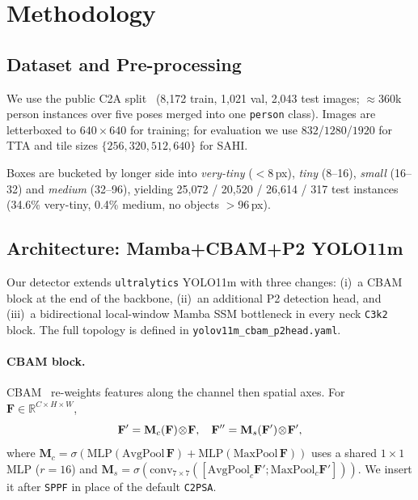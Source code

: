 \documentclass[11pt,a4paper]{article}
\begin{document}
\section{Methodology}
\subsection{Dataset and Pre-processing}
We use the public C2A split~\cite{nihal2024c2a} (8{,}172 train,
1{,}021 val, 2{,}043 test images; $\approx$360k person instances over
five poses merged into one \texttt{person} class). Images are
letterboxed to $640\!\times\!640$ for training; for evaluation we use
$832$/$1280$/$1920$ for TTA and tile sizes $\{256,320,512,640\}$ for
SAHI.

Boxes are bucketed by longer side into \textit{very-tiny} ($<$8\,px),
\textit{tiny} (8--16), \textit{small} (16--32) and \textit{medium}
(32--96), yielding 25{,}072 / 20{,}520 / 26{,}614 / 317 test instances
(34.6\% very-tiny, 0.4\% medium, no objects $>$96\,px).

\subsection{Architecture: Mamba+CBAM+P2 YOLO11m}
Our detector extends \texttt{ultralytics} YOLO11m with three changes:
(i)~a CBAM block at the end of the backbone, (ii)~an additional P2
detection head, and (iii)~a bidirectional local-window Mamba SSM
bottleneck in every neck \texttt{C3k2} block. The full topology is
defined in \texttt{yolov11m\_cbam\_p2head.yaml}.

\paragraph{CBAM block.}
CBAM~\cite{woo2018cbam} re-weights features along the channel then
spatial axes. For
$\mathbf{F}\!\in\!\mathbb{R}^{C\times H\times W}$,
\begin{equation}\small
\mathbf{F}'=\mathbf{M}_c(\mathbf{F})\!\otimes\!\mathbf{F},\quad
\mathbf{F}''=\mathbf{M}_s(\mathbf{F}')\!\otimes\!\mathbf{F}',
\end{equation}
where
$\mathbf{M}_c=\sigma(\mathrm{MLP}(\mathrm{AvgPool}\,\mathbf{F})+\mathrm{MLP}(\mathrm{MaxPool}\,\mathbf{F}))$
uses a shared $1\!\times\!1$ MLP ($r{=}16$) and
$\mathbf{M}_s=\sigma(\mathrm{conv}_{7\times7}([\mathrm{AvgPool}_c\mathbf{F}';\mathrm{MaxPool}_c\mathbf{F}']))$.
We insert it after \texttt{SPPF} in place of the default
\texttt{C2PSA}.
\end{document}
